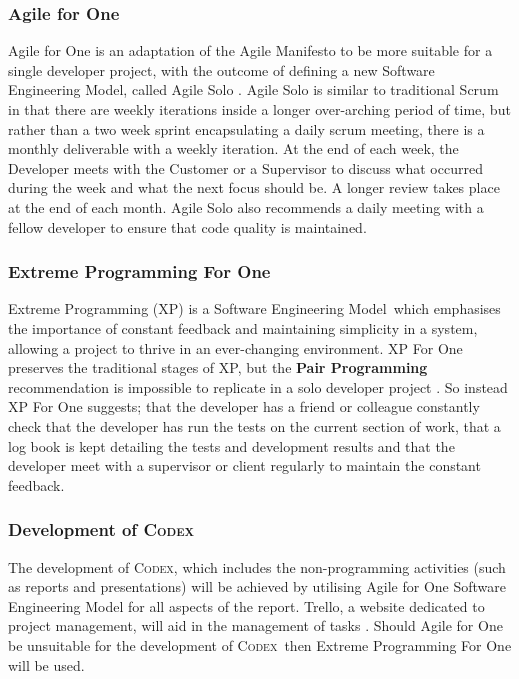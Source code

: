 \documentclass[review]{cmpreport}
\newcommand{\sem}{Software Engineering Model}
\newcommand{\Codex}{\textsc{Codex}}
\begin{document}
	\subsubsection{Agile for One}
	Agile for One is an adaptation of the Agile Manifesto to be more suitable for a single developer project, with the outcome of defining a new \sem , called Agile Solo \cite{AgileSolo}. Agile Solo is similar to traditional Scrum in that there are weekly iterations inside a longer over-arching period of time, but rather than a two week sprint encapsulating a daily scrum meeting, there is a monthly deliverable with a weekly iteration. At the end of each week, the Developer meets with the Customer or a Supervisor to discuss what occurred during the week and what the next focus should be. A longer review takes place at the end of each month. Agile Solo also recommends a daily meeting with a fellow developer to ensure that code quality is maintained. 
	
	\subsubsection{Extreme Programming For One}
	Extreme Programming (XP) is a \sem \ which emphasises the importance of constant feedback and maintaining simplicity in a system, allowing a project to thrive in an ever-changing environment. XP For One preserves the traditional stages of XP, but the \textbf{Pair Programming} recommendation is impossible to replicate in a solo developer project \cite{SoloXP}. So instead XP For One suggests; that the developer has a friend or colleague constantly check that the developer has run the tests on the current section of work, that a log book is kept detailing the tests and development results and that the developer meet with a supervisor or client regularly to maintain the constant feedback. 
	
	\subsubsection{Development of \Codex}
	The development of \Codex, which includes the non-programming activities (such as reports and presentations) will be achieved by utilising Agile for One Software Engineering Model for all aspects of the report. Trello, a website dedicated to project management, will aid in the management of tasks \cite{Trello}. Should Agile for One be unsuitable for the development of \Codex \ then Extreme Programming For One will be used. 
	
\end{document}
